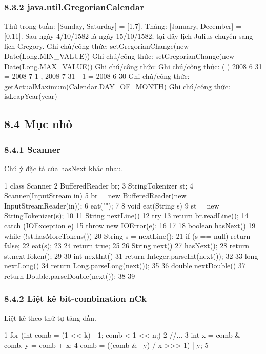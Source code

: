 \documentclass[11pt]{article}
\begin{document}
\subsubsection{8.3.2 java.util.GregorianCalendar}
\begin{NoteBlock}
Thứ trong tuần: [Sunday, Saturday] = [1,7].
Tháng: [January, December] = [0,11].
Sau ngày 4/10/1582 là ngày 15/10/1582; tại đây lịch Julius chuyển sang lịch Gregory.
Ghi chú/công thức: setGregorianChange(new Date(Long.MIN_VALUE))
Ghi chú/công thức: setGregorianChange(new Date(Long.MAX_VALUE))
Ghi chú/công thức: 
Ghi chú/công thức: ( ) 2008   6   31   = 2008   7   1  , 2008   7   31   - 1   = 2008   6   30
Ghi chú/công thức: getActualMaximum(Calendar.DAY_OF_MONTH)
Ghi chú/công thức: isLeapYear(year)
\end{NoteBlock}
\subsection{8.4 Mục nhỏ}
\subsubsection{8.4.1 Scanner}
\begin{NoteBlock}
Chú ý đặc tả của hasNext khác nhau.
\end{NoteBlock}
\begin{Code}
1 class Scanner {
2 BufferedReader br;
3 StringTokenizer st;
4 Scanner(InputStream in) {
5 br = new BufferedReader(new InputStreamReader(in));
6 eat("");
7 }
8 void eat(String s) {
9 st = new StringTokenizer(s);
10 }
11 String nextLine() {
12 try {
13 return br.readLine();
14 } catch (IOException e) {
15 throw new IOError(e);
16 }
17 }
18 boolean hasNext() {
19 while (!st.hasMoreTokens()) {
20 String s = nextLine();
21 if (s == null) return false;
22 eat(s);
23 }
24 return true;
25 }
26 String next() {
27 hasNext();
28 return st.nextToken();
29 }
30 int nextInt() {
31 return Integer.parseInt(next());
32 }
33 long nextLong() {
34 return Long.parseLong(next());
35 }
36 double nextDouble() {
37 return Double.parseDouble(next());
38 }
39 }
\end{Code}
\subsubsection{8.4.2 Liệt kê bit-combination nCk}
\begin{NoteBlock}
Liệt kê theo thứ tự tăng dần.
\end{NoteBlock}
\begin{Code}
1 for (int comb = (1 << k) - 1; comb < 1 << n;) {
2 //...
3 int x = comb & -comb, y = comb + x;
4 comb = ((comb & ~y) / x >>> 1) | y;
5 }
\end{Code}
\end{document}
